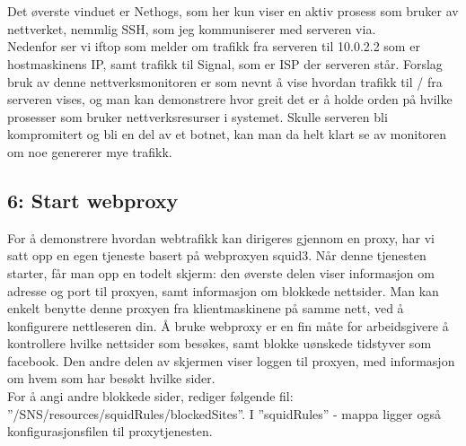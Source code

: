\documentclass{article}
\begin{document}
\\ \\
Det øverste vinduet er Nethogs, som her kun viser en aktiv prosess som bruker av nettverket, nemmlig SSH, som jeg kommuniserer med serveren via. \\ 
Nedenfor ser vi iftop som melder om trafikk fra serveren til 10.0.2.2 som er hostmaskinens IP, samt trafikk til Signal, som er ISP der serveren står.
Forslag bruk av denne nettverksmonitoren er som nevnt å vise hvordan trafikk til / fra serveren vises, og man kan demonstrere hvor greit det er å holde orden på hvilke prosesser som bruker nettverksresurser i systemet. Skulle serveren bli kompromitert og bli en del av et botnet, kan man da helt klart se av monitoren om noe genererer mye trafikk. 
\subsection{6: Start webproxy}
For å demonstrere hvordan webtrafikk kan dirigeres gjennom en proxy, har vi satt opp en egen tjeneste basert på webproxyen squid3. Når denne tjenesten starter, får man opp en todelt skjerm: den øverste delen viser informasjon om adresse og port til proxyen, samt informasjon om blokkede nettsider. Man kan enkelt benytte denne proxyen fra klientmaskinene på samme nett, ved å konfigurere nettleseren din. Å bruke webproxy er en fin måte for arbeidsgivere å kontrollere hvilke nettsider som besøkes, samt blokke uønskede tidstyver som facebook. Den andre delen av skjermen viser loggen til proxyen, med informasjon om hvem som har besøkt hvilke sider. \\
For å angi andre blokkede sider, rediger følgende fil: ''/SNS/resources/squidRules/blockedSites''. I ''squidRules'' - mappa ligger også konfigurasjonsfilen til proxytjenesten.
\\ \\
\end{document}
